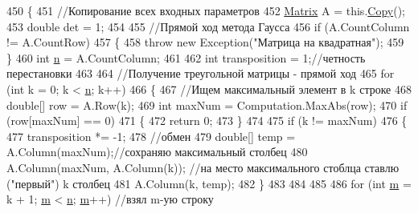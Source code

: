\begin{DoxyCode}
450         \{
451             \textcolor{comment}{//Копирование всех входных параметров}
452             \hyperlink{class_b_l_a_s_1_1_matrix_a347802ba2127f13d57a24d99d36137d9}{Matrix} A = this.\hyperlink{class_b_l_a_s_1_1_matrix_acbb991a74ebf35c9932aaedc8b936f51}{Copy}();
453             \textcolor{keywordtype}{double} det = 1;
454 
455             \textcolor{comment}{//Прямой ход метода Гаусса}
456             \textcolor{keywordflow}{if} (A.CountColumn != A.CountRow)
457             \{
458                 \textcolor{keywordflow}{throw} \textcolor{keyword}{new} Exception(\textcolor{stringliteral}{"Матрица на квадратная"});
459             \}
460             \textcolor{keywordtype}{int} \hyperlink{class_b_l_a_s_1_1_matrix_a0faac6434774d4c500a2dce48dcd8b84}{n} = A.CountColumn;
461 
462             \textcolor{keywordtype}{int} transposition = 1;\textcolor{comment}{//четность перестановки}
463 
464             \textcolor{comment}{//Получение треугольной матрицы - прямой ход }
465             \textcolor{keywordflow}{for} (\textcolor{keywordtype}{int} k = 0; k < \hyperlink{class_b_l_a_s_1_1_matrix_a0faac6434774d4c500a2dce48dcd8b84}{n}; k++)
466             \{
467                 \textcolor{comment}{//Ищем максимальный элемент в k строке}
468                 \textcolor{keywordtype}{double}[] row = A.Row(k);
469                 \textcolor{keywordtype}{int} maxNum = Computation.MaxAbs(row);
470                 \textcolor{keywordflow}{if} (row[maxNum] == 0)
471                 \{
472                     \textcolor{keywordflow}{return} 0;
473                 \}
474 
475                 \textcolor{keywordflow}{if} (k != maxNum)
476                 \{
477                     transposition *= -1;
478                     \textcolor{comment}{//обмен}
479                     \textcolor{keywordtype}{double}[] temp = A.Column(maxNum);\textcolor{comment}{//сохраняю максимальный столбец }
480                     A.Column(maxNum, A.Column(k)); \textcolor{comment}{//на место максимального стоблца ставлю ("первый") k
       столбец}
481                     A.Column(k, temp);
482                 \}
483 
484 
485 
486                 \textcolor{keywordflow}{for} (\textcolor{keywordtype}{int} \hyperlink{class_b_l_a_s_1_1_matrix_aa6751bae1ef176548c952a7789953bfa}{m} = k + 1; \hyperlink{class_b_l_a_s_1_1_matrix_aa6751bae1ef176548c952a7789953bfa}{m} < \hyperlink{class_b_l_a_s_1_1_matrix_a0faac6434774d4c500a2dce48dcd8b84}{n}; \hyperlink{class_b_l_a_s_1_1_matrix_aa6751bae1ef176548c952a7789953bfa}{m}++) \textcolor{comment}{//взял m-ую строку }

\end{DoxyCode}
